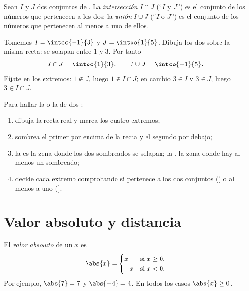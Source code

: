 \begin{definition}\label{def:g10:numbers:interunion}
Sean $I$ y $J$ dos conjuntos de .
La \emph{intersección} $I \cap J$ (``$I$ y $J$'') es
el conjunto de los números que pertenecen a los dos; la
\emph{unión} $I \cup J$ (``$I$ o $J$'') es el conjunto de los
números que pertenecen al menos a uno de ellos.
\end{definition}

\begin{example}\label{ex:g10:numbers:interunion}
Tomemos $I = \intcc{-1}{3}$ y $J = \intoo{1}{5}$. Dibuja los dos sobre la
misma recta: se solapan entre $1$ y $3$. Por tanto
\[
I \cap J = \intoc{1}{3},
\qquad
I \cup J = \intco{-1}{5}.
\]
Fíjate en los extremos: $1 \notin J$, luego $1 \notin I \cap J$; en cambio
$3 \in I$ y $3 \in J$, luego $3 \in I \cap J$.
\end{example}

\begin{method}\label{met:g10:numbers:intervals}
Para hallar la  o la  de dos :
\begin{enumerate}
  \item dibuja la recta real y marca los cuatro extremos;
  \item sombrea el primer  por encima de la recta y el segundo por
        debajo;
  \item la  es la zona donde los dos sombreados se solapan; la
        , la zona donde hay al menos un sombreado;
  \item decide cada extremo comprobando si pertenece a los dos conjuntos
        () o al menos a uno ().
\end{enumerate}
\end{method}

\section{Valor absoluto y distancia}

\begin{definition}\label{def:g10:numbers:abs}
El \emph{valor absoluto} de un  $x$ es
\[
\abs{x} =
\begin{cases}
x & \text{si } x \geq 0, \\
-x & \text{si } x < 0.
\end{cases}
\]
Por ejemplo, $\abs{7} = 7$ y $\abs{-4} = 4$. En todos los casos
$\abs{x} \geq 0$.
\end{definition}

